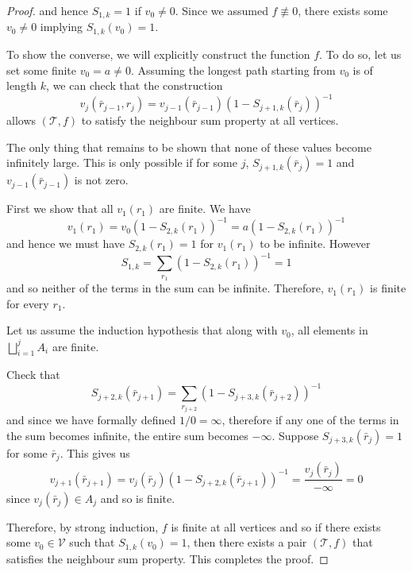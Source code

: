 \documentclass[10pt,a4paper]{amsart}
\begin{document}
\begin{proof}
    and hence $S_{1,k} = 1$ if $v_0\neq 0$. Since we assumed $f\not\equiv 0$, there exists some $v_0\neq 0$ implying $S_{1,k}(v_0)=1$.

    To show the converse,  we will explicitly construct the function $f$. To do so, let us set some finite $v_0 = a\neq 0$. Assuming the longest path starting from $v_0$ is of length $k$, we can check that the construction $$v_j(\bar{r}_{j-1},r_j)=v_{j-1}(\bar{r}_{j-1})(1-S_{j+1,k}(\bar{r}_j))^{-1}$$ allows $(\mathcal T, f)$ to satisfy the neighbour sum property at all vertices. 
    
    The only thing that remains to be shown that none of these values become infinitely large. This is only possible if for some $j$, $S_{j+1,k}(\bar{r}_j)=1$ and $v_{j-1}(\bar{r}_{j-1})$ is not zero.

    First we show that all $v_1(r_1)$ are finite. We have
    $$v_1(r_1)=v_0(1-S_{2,k}(r_1))^{-1} = a(1-S_{2,k}(r_1))^{-1}$$
    and hence we must have $S_{2,k}(r_1)=1$ for $v_1(r_1)$ to be infinite. However
    $$S_{1,k} = \sum_{r_1}(1-S_{2,k}(r_1))^{-1} = 1$$
    and so neither of the terms in the sum can be infinite. Therefore, $v_1(r_1)$ is finite for every $r_1$.

    
    Let us assume the induction hypothesis that along with $v_0$, all elements in $\bigsqcup_{i=1}^j A_i$ are finite.
    
    Check that
    $$S_{j+2,k}(\bar{r}_{j+1}) = \sum_{r_{j+2}}\left(1-S_{j+3,k}(\bar{r}_{j+2})\right)^{-1}$$
    and since we have formally defined $1/0=\infty$, therefore if any one of the terms in the sum becomes infinite, the entire sum becomes $-\infty$. Suppose $S_{j+3,k}(\bar{r}_j)=1$ for some $\bar{r}_j$. This gives us $$
    v_{j+1}(\bar{r}_{j+1}) = v_{j}(\bar{r}_{j})(1-S_{j+2,k}(\bar{r}_{j+1}))^{-1} = \dfrac{v_{j}(\bar{r}_{j})}{-\infty}=0$$
    since $v_{j}(\bar{r}_j)\in A_j$ and so is finite.

    Therefore, by strong induction, $f$ is finite at all vertices and so if there exists some $v_0\in\mathcal{V}$ such that $S_{1,k}(v_0)=1$, then there exists a pair $(\mathcal{T}, f)$ that satisfies the neighbour sum property. This completes the proof.
\end{proof}
\end{document}
